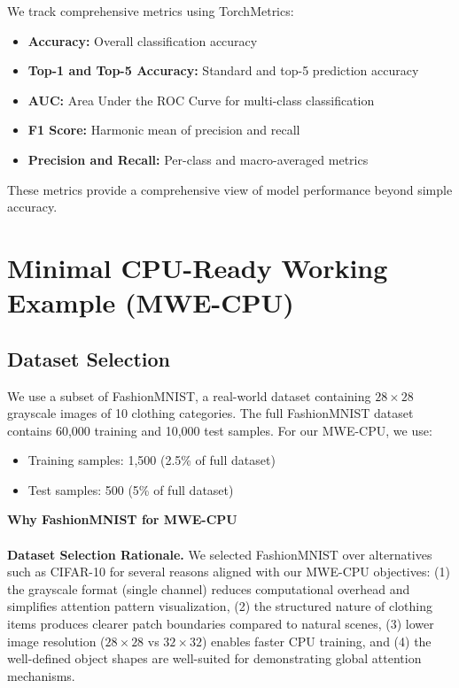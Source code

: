 \documentclass{article}
\begin{document}
We track comprehensive metrics using TorchMetrics:
\begin{itemize}
    \item \textbf{Accuracy:} Overall classification accuracy
    \item \textbf{Top-1 and Top-5 Accuracy:} Standard and top-5 prediction accuracy
    \item \textbf{AUC:} Area Under the ROC Curve for multi-class classification
    \item \textbf{F1 Score:} Harmonic mean of precision and recall
    \item \textbf{Precision and Recall:} Per-class and macro-averaged metrics
\end{itemize}

These metrics provide a comprehensive view of model performance beyond simple accuracy.

\section{Minimal CPU-Ready Working Example (MWE-CPU)}

\subsection{Dataset Selection}

We use a subset of FashionMNIST, a real-world dataset containing $28 \times 28$ grayscale images of 10 clothing categories. The full FashionMNIST dataset contains 60,000 training and 10,000 test samples. For our MWE-CPU, we use:
\begin{itemize}
    \item Training samples: 1,500 (2.5\% of full dataset)
    \item Test samples: 500 (5\% of full dataset)
\end{itemize}

\textbf{Why FashionMNIST for MWE-CPU}\\ \\ \textbf{Dataset Selection Rationale.} We selected FashionMNIST over alternatives 
such as CIFAR-10 for several reasons aligned with our MWE-CPU objectives: 
(1) the grayscale format (single channel) reduces computational overhead and 
simplifies attention pattern visualization, (2) the structured nature of clothing 
items produces clearer patch boundaries compared to natural scenes, (3) lower 
image resolution ($28 \times 28$ vs $32 \times 32$) enables faster CPU training, 
and (4) the well-defined object shapes are well-suited for demonstrating global 
attention mechanisms.
\end{document}
